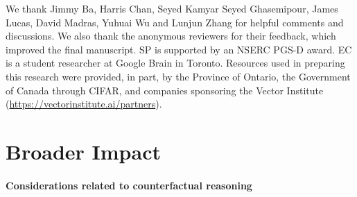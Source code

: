 \documentclass{article}
\begin{document}
\begin{ack}

We thank Jimmy Ba, Harris Chan, Seyed Kamyar Seyed Ghasemipour, James Lucas, David Madras, Yuhuai Wu and Lunjun Zhang for helpful comments and discussions. 
We also thank the anonymous reviewers for their feedback, which improved the final manuscript.
SP is supported by an NSERC PGS-D award. EC is a student researcher at Google Brain in Toronto.
Resources used in preparing this research were provided, in part, by the Province of Ontario, the Government of Canada through {CIFAR}, and companies sponsoring the Vector Institute ({\url{https://vectorinstitute.ai/partners}}).
\end{ack}

\section*{Broader Impact}

\paragraph{Considerations related to counterfactual reasoning}
\end{document}
